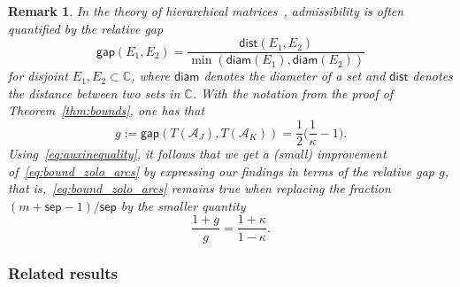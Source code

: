 \documentclass[final,reqno,onefignum,onetabnum]{siamart190516}
\newcommand{\sep}{\mathsf{sep}}
\newtheorem{remark}[theorem]{Remark}
\begin{document}
\begin{remark}
In the theory of hierarchical matrices~\cite[Sec 5.2.2]{hackbusch2015hierarchical}, admissibility is often quantified by the relative gap 
\[
 \mathsf{gap}(E_1,E_2) = \frac{\mathsf{dist}(E_1,E_2)}{\min(\mathsf{diam}(E_1),\mathsf{diam}(E_2))}
\]
for disjoint $E_1,E_2 \subset \mathbb C$, where $\mathsf{diam}$ denotes the diameter of a set and $\mathsf{dist}$ denotes the
distance between two sets in $\mathbb C$. With the notation from the proof of Theorem~\ref{thm:bounds}, one has that
\[
 g:=\mathsf{gap}( T(\mathcal{A}_J),T(\mathcal{A}_K)) = \frac12 \Big( \frac{1}{\kappa} - 1 \Big).
\]
Using~\eqref{eq:auxinequality}, it follows
that we get a (small) improvement of~\eqref{eq:bound_zolo_arcs} by expressing our findings in terms of the relative gap $g$, that is,~\eqref{eq:bound_zolo_arcs} remains true when replacing the fraction $(m+\sep-1)/\sep$ by the smaller quantity
$$
    \frac{1+g}{g} = \frac{1+\kappa}{1-\kappa} .
$$
\end{remark}

 
\subsubsection{Related results}
\end{document}
